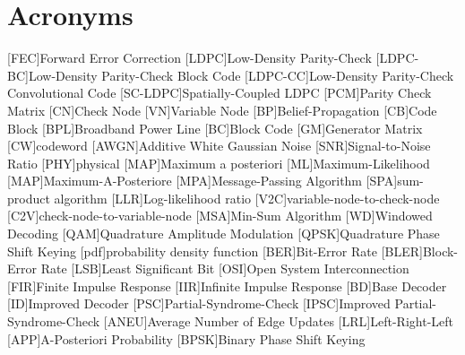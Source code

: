 \chapter*{Acronyms}
\begin{acronym}[LDPC-CC]
  [FEC]{Forward Error Correction}
  [LDPC]{Low-Density Parity-Check}
  [LDPC-BC]{Low-Density Parity-Check Block Code}
  [LDPC-CC]{Low-Density Parity-Check Convolutional Code}
  [SC-LDPC]{Spatially-Coupled LDPC}
  [PCM]{Parity Check Matrix}
  [CN]{Check Node}
  [VN]{Variable Node}
  [BP]{Belief-Propagation}
  [CB]{Code Block}
  [BPL]{Broadband Power Line}
  [BC]{Block Code}
  [GM]{Generator Matrix}
  [CW]{codeword}
  [AWGN]{Additive White Gaussian Noise}
  [SNR]{Signal-to-Noise Ratio}
  [PHY]{physical}
  [MAP]{Maximum a posteriori}
  [ML]{Maximum-Likelihood}
  [MAP]{Maximum-A-Posteriore}
  [MPA]{Message-Passing Algorithm}
  [SPA]{sum-product algorithm}
  [LLR]{Log-likelihood ratio}
  [V2C]{variable-node-to-check-node}
  [C2V]{check-node-to-variable-node}
  [MSA]{Min-Sum Algorithm}
  [WD]{Windowed Decoding}
  [QAM]{Quadrature Amplitude Modulation}
  [QPSK]{Quadrature Phase Shift Keying}
  [pdf]{probability density function}
  [BER]{Bit-Error Rate}
  [BLER]{Block-Error Rate}
  [LSB]{Least Significant Bit}
  [OSI]{Open System Interconnection}
  [FIR]{Finite Impulse Response}
  [IIR]{Infinite Impulse Response}
  [BD]{Base Decoder}
  [ID]{Improved Decoder}
  [PSC]{Partial-Syndrome-Check}
  [IPSC]{Improved Partial-Syndrome-Check}
  [ANEU]{Average Number of Edge Updates}
  [LRL]{Left-Right-Left}
  [APP]{A-Posteriori Probability}
  [BPSK]{Binary Phase Shift Keying}
\end{acronym}
